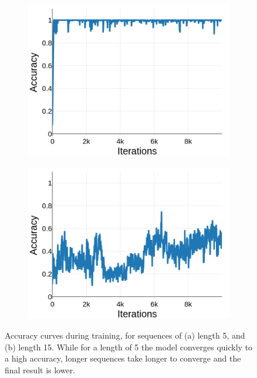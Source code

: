 \documentclass{article}
\begin{document}
\begin{figure}[t]
\begin{subfigure}{0.49\textwidth}
\centering
\includegraphics[scale=0.22]{img/rnn-acc-L5}
\caption{}
\end{subfigure}
\begin{subfigure}{0.49\textwidth}
\centering
\includegraphics[scale=0.22]{img/rnn-acc-L15}
\caption{}
\end{subfigure}
 \caption{Accuracy curves during training, for sequences of (a) length 5, and (b) length 15. While for a length of 5 the model converges quickly to a high accuracy, longer sequences take longer to converge and the final result is lower.}
\label{fig:rnn_acc_curves}
\end{figure}
\end{document}
